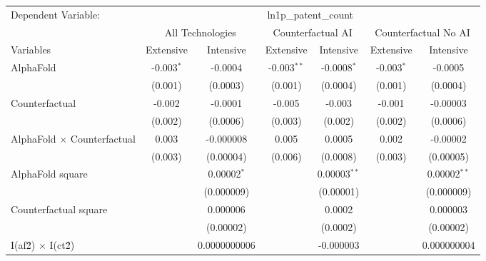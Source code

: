 \begingroup
\centering
\begin{tabular}{lcccccc}
   \tabularnewline \midrule \midrule
   Dependent Variable: & \multicolumn{6}{c}{ln1p\_patent\_count}\\
 & \multicolumn{2}{c}{All Technologies} & \multicolumn{2}{c}{Counterfactual AI} & \multicolumn{2}{c}{Counterfactual No AI} \\
\cmidrule(lr){1-1}\cmidrule(lr){2-3} \cmidrule(lr){4-5} \cmidrule(lr){6-7}
Variables & \multicolumn{1}{c}{Extensive} & \multicolumn{1}{c}{Intensive} & \multicolumn{1}{c}{Extensive} & \multicolumn{1}{c}{Intensive} & \multicolumn{1}{c}{Extensive} & \multicolumn{1}{c}{Intensive} \\
\cmidrule(lr){1-1}\cmidrule(lr){2-2} \cmidrule(lr){3-3} \cmidrule(lr){4-4} \cmidrule(lr){5-5} \cmidrule(lr){6-6} \cmidrule(lr){7-7}
   AlphaFold                          & -0.003$^{*}$ & -0.0004       & -0.003$^{**}$ & -0.0008$^{*}$  & -0.003$^{*}$ & -0.0005\\   
                                      & (0.001)      & (0.0003)      & (0.001)       & (0.0004)       & (0.001)      & (0.0004)\\   
   Counterfactual                     & -0.002       & -0.0001       & -0.005        & -0.003         & -0.001       & -0.00003\\   
                                      & (0.002)      & (0.0006)      & (0.003)       & (0.002)        & (0.002)      & (0.0006)\\   
   AlphaFold $\times$ Counterfactual  & 0.003        & -0.000008     & 0.005         & 0.0005         & 0.002        & -0.00002\\   
                                      & (0.003)      & (0.00004)     & (0.006)       & (0.0008)       & (0.003)      & (0.00005)\\   
   AlphaFold square                   &              & 0.00002$^{*}$ &               & 0.00003$^{**}$ &              & 0.00002$^{**}$\\   
                                      &              & (0.000009)    &               & (0.00001)      &              & (0.000009)\\   
   Counterfactual square              &              & 0.000006      &               & 0.0002         &              & 0.000003\\   
                                      &              & (0.00002)     &               & (0.0002)       &              & (0.00002)\\   
   I(af\^2) $\times$ I(ct\^2)         &              & 0.0000000006  &               & -0.000003      &              & 0.000000004\\   

\end{tabular}

